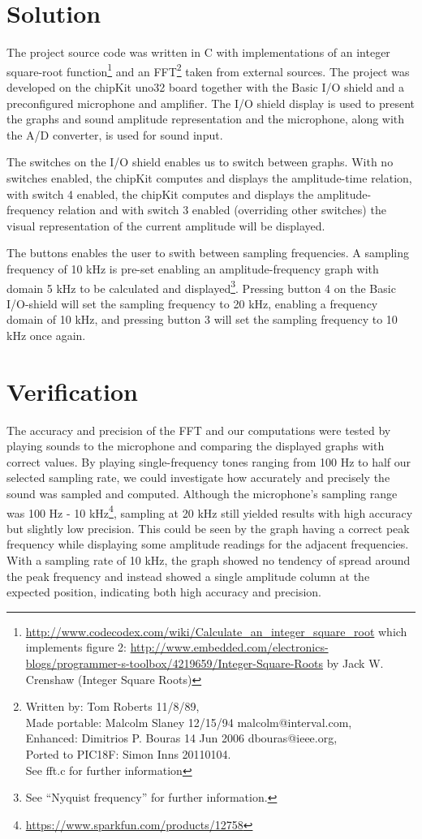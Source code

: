\documentclass[a4paper,11pt]{article}
\begin{document}
\section*{Solution}
The project source code was written in C with implementations of an integer square-root function\footnote{\url{http://www.codecodex.com/wiki/Calculate_an_integer_square_root} which implements figure 2: \url{http://www.embedded.com/electronics-blogs/programmer-s-toolbox/4219659/Integer-Square-Roots} by Jack W. Crenshaw (Integer Square Roots)} 
and an FFT\footnote{Written by:  Tom Roberts  11/8/89, \\Made portable:  Malcolm Slaney 12/15/94 malcolm@interval.com, \\Enhanced:  Dimitrios P. Bouras  14 Jun 2006 dbouras@ieee.org, \\Ported to PIC18F:  Simon Inns 20110104.\\ See fft.c for further information} 
taken from external sources. The project was developed on the chipKit uno32 board together with the Basic I/O shield and a preconfigured microphone and amplifier. The I/O shield display is used to present the graphs and sound amplitude representation and the microphone, along with the A/D converter, is used for sound input. 

The switches on the I/O shield enables us to switch between graphs. With no switches enabled, the chipKit computes and displays the amplitude-time relation, with switch 4 enabled, the chipKit computes and displays the amplitude-frequency relation and with switch 3 enabled (overriding other switches) the visual representation of the current amplitude will be displayed.

The buttons enables the user to swith between sampling frequencies. A sampling frequency of 10 kHz is pre-set enabling an amplitude-frequency graph with domain 5 kHz to be calculated and displayed\footnote{See ``Nyquist frequency'' for further information.}. Pressing button 4 on the Basic I/O-shield will set the sampling frequency to 20 kHz, enabling a frequency domain of 10 kHz, and pressing button 3 will set the sampling frequency to 10 kHz once again.



\section*{Verification}
The accuracy and precision of the FFT and our computations were tested by playing sounds to the microphone and comparing the displayed graphs with correct values. By playing single-frequency tones ranging from 100 Hz to half our selected sampling rate, we could investigate how accurately and precisely the sound was sampled and computed. Although the microphone's sampling range was 100 Hz - 10 kHz\footnote{\url{https://www.sparkfun.com/products/12758}}, sampling at 20 kHz still yielded results with high accuracy but slightly low precision. This could be seen by the graph having a correct peak frequency while displaying some amplitude readings for the adjacent frequencies. With a sampling rate of 10 kHz, the graph showed no tendency of spread around the peak frequency and instead showed a single amplitude column at the expected position, indicating both high accuracy and precision.
\end{document}
